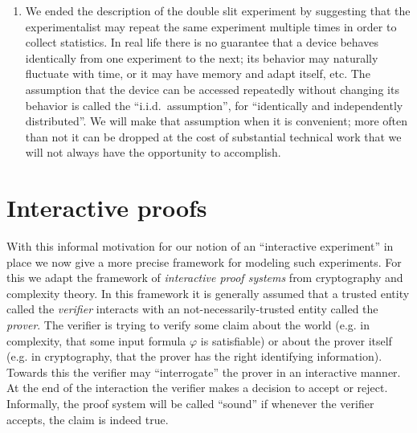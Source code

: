 \begin{enumerate}
\item We ended the description of the double slit experiment by suggesting that the experimentalist may repeat the same experiment multiple times in order to collect statistics. In real life there is no guarantee that a device behaves identically from one experiment to the next; its behavior may naturally fluctuate with time, or it may have memory and adapt itself, etc. The assumption that the device can be accessed repeatedly without changing its behavior is called the ``i.i.d.\ assumption'', for ``identically and independently distributed''. We will make that assumption when it is convenient; more often than not it can be dropped at the cost of substantial technical work that we will not always have the opportunity to accomplish. 
\end{enumerate}


\section{Interactive proofs}
\label{sec:ips-informal}

With this informal motivation for our notion of an ``interactive experiment'' in place we now give a more precise framework for modeling such experiments. For this we adapt the framework of \emph{interactive proof systems} from cryptography and complexity theory. In this framework it is generally assumed that a trusted entity called the \emph{verifier} interacts with an not-necessarily-trusted entity called the \emph{prover}. The verifier is trying to verify some claim about the world (e.g. in complexity, that some input formula $\varphi$ is satisfiable) or about the prover itself (e.g. in cryptography, that the prover has the right identifying information). Towards this the verifier may ``interrogate'' the prover in an interactive manner. At the end of the interaction the verifier makes a decision to accept or reject. Informally, the proof system will be called ``sound'' if whenever the verifier accepts, the claim is indeed true. 


